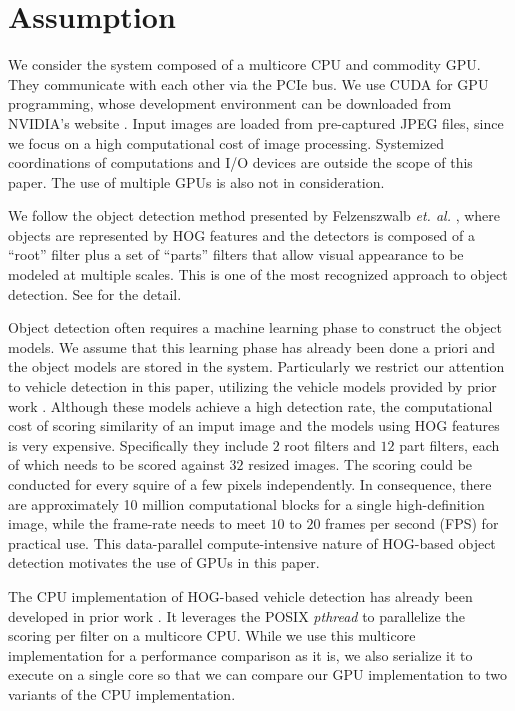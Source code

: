 \section{Assumption}
\label{sec:assumption}

We consider the system composed of a multicore CPU and commodity GPU.
They communicate with each other via the PCIe bus.
We use CUDA \cite{NVIDIA_CUDA} for GPU programming, whose development
environment can be downloaded from NVIDIA's website \cite{NVIDIA_NVCC}.
Input images are loaded from pre-captured JPEG files, since we focus on
a high computational cost of image processing.
Systemized coordinations of computations and I/O devices are outside the
scope of this paper.
The use of multiple GPUs is also not in consideration.

We follow the object detection method presented by Felzenszwalb
\textit{et. al.} \cite{Felzenszwalb10}, where objects are represented by
HOG features \cite{Dalal05} and the detectors is composed of a ``root''
filter plus a set of ``parts'' filters that allow visual appearance to
be modeled at multiple scales.
This is one of the most recognized approach to object detection.
See \cite{Felzenszwalb10} for the detail.

Object detection often requires a machine learning phase to construct
the object models.
We assume that this learning phase has already been done a priori and
the object models are stored in the system.
Particularly we restrict our attention to vehicle detection in this
paper, utilizing the vehicle models provided by prior work
\cite{Niknejad12}.
Although these models achieve a high detection rate, the computational
cost of scoring similarity of an imput image and the models using HOG
features is very expensive.
Specifically they include $2$ root filters and $12$ part filters, each
of which needs to be scored against $32$ resized images.
The scoring could be conducted for every squire of a few pixels
independently.
In consequence, there are approximately 10 million computational
blocks for a single high-definition image, while the frame-rate needs to
meet $10$ to $20$ frames per second (FPS) for practical use.
This data-parallel compute-intensive nature of HOG-based object
detection motivates the use of GPUs in this paper.

The CPU implementation of HOG-based vehicle detection has already been
developed in prior work \cite{Niknejad12}.
It leverages the POSIX \textit{pthread} to parallelize the scoring per
filter on a multicore CPU.
While we use this multicore implementation for a performance comparison
as it is, we also serialize it to execute on a single core so that we
can compare our GPU implementation to two variants of the CPU
implementation.
